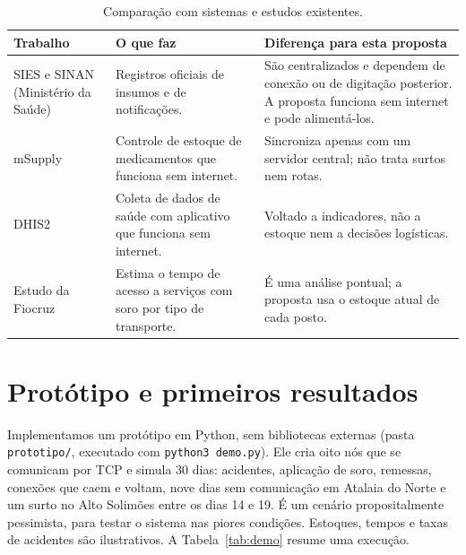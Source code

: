 \documentclass[a4paper,12pt]{article}
\begin{document}
\begin{table}[htbp]
  \centering
  \caption{Comparação com sistemas e estudos existentes.}
  \label{tab:relacionados}
  \small
  \begin{tabularx}{\textwidth}{>{\raggedright\arraybackslash}p{2.7cm}XX}
    \toprule
    Trabalho & O que faz & Diferença para esta proposta \\
    \midrule
    SIES e SINAN (Ministério da Saúde)~\cite{nt127} & Registros oficiais de
      insumos e de notificações. & São centralizados e dependem de conexão ou
      de digitação posterior. A proposta funciona sem internet e pode
      alimentá-los. \\
    mSupply~\cite{msupply} & Controle de estoque de medicamentos que funciona
      sem internet. & Sincroniza apenas com um servidor central; não trata
      surtos nem rotas. \\
    DHIS2~\cite{dhis2} & Coleta de dados de saúde com aplicativo que funciona
      sem internet. & Voltado a indicadores, não a estoque nem a decisões
      logísticas. \\
    Estudo da Fiocruz~\cite{fiocruz2024} & Estima o tempo de acesso a serviços
      com soro por tipo de transporte. & É uma análise pontual; a proposta usa
      o estoque atual de cada posto. \\
    \bottomrule
  \end{tabularx}
\end{table}

\section{Protótipo e primeiros resultados}
\label{sec:prototipo}

Implementamos um protótipo em Python, sem bibliotecas externas (pasta
\texttt{prototipo/}, executado com \texttt{python3 demo.py}). Ele cria oito
nós que se comunicam por TCP e simula 30 dias: acidentes, aplicação de soro,
remessas, conexões que caem e voltam, nove dias sem comunicação em Atalaia do
Norte e um surto no Alto Solimões entre os dias 14 e 19. É um cenário
propositalmente pessimista, para testar o sistema nas piores condições. Estoques, tempos e
taxas de acidentes são ilustrativos. A Tabela~\ref{tab:demo} resume uma
execução.
\end{document}
